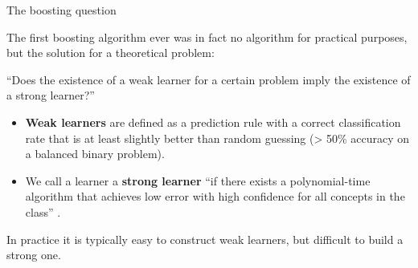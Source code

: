 \documentclass[11pt,compress,t,notes=noshow, xcolor=table]{beamer}
\begin{document}
\begin{vbframe}{The boosting question}

The first boosting algorithm ever was in fact no algorithm for practical purposes, but the solution for a theoretical problem:

\lz

\enquote{Does the existence of a weak learner for a certain problem imply
the existence of a strong learner?} 

\lz

\begin{itemize}
\item \textbf{Weak learners} are defined as a prediction rule with a correct classification rate that is at least slightly better than random guessing (> 50\% accuracy on a balanced binary problem).
\item We call a learner a \textbf{strong learner} \enquote{if there exists a polynomial-time algorithm that achieves low error with high confidence for all concepts in the class} .

\end{itemize}

In practice it is typically easy to construct weak learners, but difficult to build a strong one.

\end{vbframe}


\end{document}
